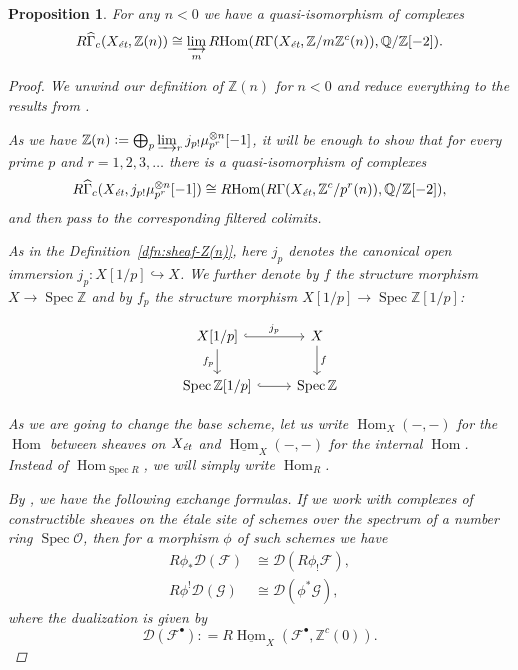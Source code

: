 \documentclass{article}
\DeclareMathOperator{\Hom}{Hom}
\DeclareMathOperator{\Spec}{Spec}
\newcommand{\QQ}{\mathbb{Q}}
\newcommand{\ZZ}{\mathbb{Z}}
\newcommand{\et}{\text{\it ét}}
\newcommand{\dfn}{\mathrel{\mathop:}=}
\newcommand{\iHom}{\underline{\Hom}}
\newcommand{\RHom}{R\!\Hom}
\newtheorem{proposition}[theorem]{Proposition}
\theoremstyle{definition}
\numberwithin{equation}{section}
\begin{document}
\begin{proposition}
  For any $n < 0$ we have a quasi-isomorphism of complexes
  \begin{equation}
    \label{eqn:duality-quasi-isomorphism-1}
    R\widehat{\Gamma}_c (X_\et, \ZZ (n)) \cong
    \varinjlim_m \RHom (R\Gamma (X_\et, \ZZ/m\ZZ^c (n)), \QQ/\ZZ [-2]).
  \end{equation}

  \begin{proof}
    We unwind our definition of $\ZZ (n)$ for $n < 0$ and reduce everything to
    the results from \cite{Geisser-2010}.

    \vspace{1em}

    As we have
    $\ZZ (n) \dfn \bigoplus_p \varinjlim_r j_{p!} \mu_{p^r}^{\otimes n} [-1]$,
    it will be enough to show that for every prime $p$ and $r=1,2,3,\ldots$
    there is a quasi-isomorphism of complexes
    \[ R\widehat{\Gamma}_c (X_\et, j_{p!} \mu_{p^r}^{\otimes n} [-1]) \cong
    \RHom (R\Gamma (X_\et, \ZZ^c/p^r (n)), \QQ/\ZZ [-2]), \]
    and then pass to the corresponding filtered colimits.

    As in the Definition~\ref{dfn:sheaf-Z(n)}, here $j_p$ denotes the canonical
    open immersion $j_p\colon X[1/p] \hookrightarrow X$. We further denote by
    $f$ the structure morphism $X\to \Spec \ZZ$ and by $f_p$ the structure
    morphism $X [1/p] \to \Spec \ZZ [1/p]$:

    \[ \begin{tikzcd}
      X [1/p]\ar[hookrightarrow]{r}{j_p}\ar{d}[swap]{f_p} & X\ar{d}{f} \\
      \Spec \ZZ [1/p]\ar[hookrightarrow]{r} & \Spec \ZZ
    \end{tikzcd} \]

    As we are going to change the base scheme, let us write $\Hom_X (-,-)$ for
    the $\Hom$ between sheaves on $X_\et$ and $\iHom_X (-,-)$ for the
    internal $\Hom$. Instead of $\Hom_{\Spec R}$, we will simply write
    $\Hom_R$.

    By \cite[Proposition 7.10, (c)]{Geisser-2010}, we have the following
    exchange formulas. If we work with complexes of constructible sheaves on the
    étale site of schemes over the spectrum of a number ring
    $\Spec\mathcal{O}$, then for a morphism $\phi$ of such schemes we have
    \begin{align}
      \label{eqn:exchange-formula-1} R \phi_* \mathcal{D} (\mathcal{F}) & \cong \mathcal{D} (R \phi_! \mathcal{F}),\\
      \label{eqn:exchange-formula-2} R \phi^! \mathcal{D} (\mathcal{G}) & \cong \mathcal{D} (\phi^* \mathcal{G}),
    \end{align}
    where the dualization is given by
    \[ \mathcal{D} (\mathcal{F}^\bullet) \dfn
    R\iHom_X (\mathcal{F}^\bullet, \ZZ^c (0)). \]


\end{proof}
\end{proposition}
\end{document}
